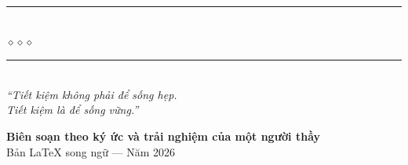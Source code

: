 \begin{titlepage}
\begin{center}
  {\color{truyenblue!60}\rule{7cm}{1pt}}\\[5pt]
  {\color{truyengold!80!black}\large$\diamond$\hspace{1cm}$\diamond$\hspace{1cm}$\diamond$}\\[5pt]
  {\color{truyenblue!60}\rule{7cm}{1pt}}\\[1.4cm]

  {\normalsize\itshape\color{truyenblue!90!black}
   ``Tiết kiệm không phải để sống hẹp.\\
   Tiết kiệm là để sống vững.''}

  \vfill

  {\fontsize{15}{19}\selectfont\bfseries\color{truyenblue!90!black}
    Biên soạn theo ký ức và trải nghiệm của một người thầy}\\[0.4cm]

  {\small\color{gray} Bản LaTeX song ngữ --- Năm 2026}\\[0.5cm]
\end{center}

\afterpage{\nopagecolor}
\end{titlepage}